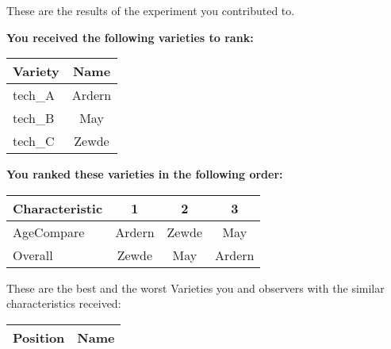 \documentclass[10pt]{article}
\begin{document}
\begin{titlepage}
	These are the results of the experiment you contributed to.

	\begin{flushleft}
		\textbf{You received the following varieties to rank: }\hfill \break
		\begin{tabularx}{\textwidth}{ X | c  }
			\hline
			\textbf{Variety} & \textbf{Name} \\ \hline

			
				tech\_A & Ardern \\ \hline
			
				tech\_B & May \\ \hline
			
				tech\_C & Zewde \\ \hline
			


		\end{tabularx}\newline \newline

		\textbf{You ranked these varieties in the following order: }\hfill \break
		\begin{tabularx}{\textwidth}{ X | c | c | c  }
			\hline
			\textbf{Characteristic}
			
				& \textbf{ 1 }
			
				& \textbf{ 2 }
			
				& \textbf{ 3 }
			
			\\ \hline


			
				AgeCompare & Ardern  & Zewde  & May  \\ \hline


			
				Overall & Zewde  & May  & Ardern  \\ \hline


			

		\end{tabularx}

	\end{flushleft}

	\pagebreak

	\begin{flushleft}
		These are the best and the worst Varieties you and observers with the similar characteristics received:\hfill \break \newline
		\begin{tabularx}{\textwidth}{ X | X  }
			\hline
			\textbf{Position} & \textbf{Name} \\ \hline


\end{tabularx}
\end{flushleft}
\end{titlepage}
\end{document}
